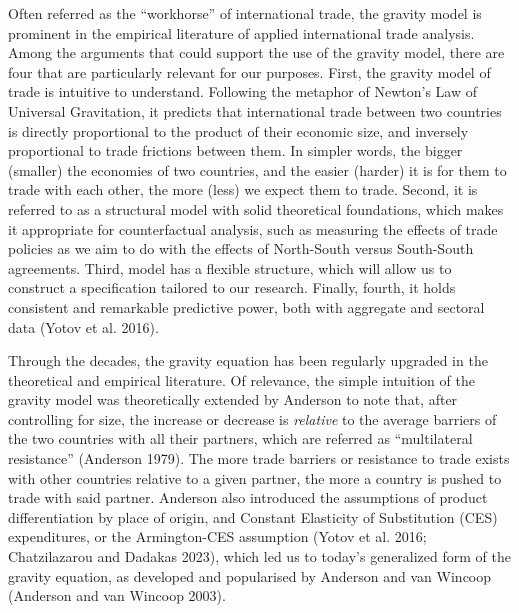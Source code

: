 \documentclass[12pt]{article}%
\begin{document}
%
Often referred as the ``workhorse'' of international trade, the gravity
model is prominent in the empirical literature of applied international
trade analysis. Among the arguments that could support the use of the
gravity model, there are four that are particularly relevant for our
purposes. First, the gravity model of trade is intuitive to understand.
Following the metaphor of Newton's Law of Universal Gravitation, it
predicts that international trade between two countries is directly
proportional to the product of their economic size, and inversely
proportional to trade frictions between them. In simpler words, the
bigger (smaller) the economies of two countries, and the easier (harder)
it is for them to trade with each other, the more (less) we expect them
to trade. Second, it is referred to as a structural model with solid
theoretical foundations, which makes it appropriate for counterfactual
analysis, such as measuring the effects of trade policies as we aim to
do with the effects of North-South versus South-South agreements. Third,
model has a flexible structure, which will allow us to construct a
specification tailored to our research. Finally, fourth, it holds
consistent and remarkable predictive power, both with aggregate and
sectoral data (Yotov et al. 2016).

Through the decades, the gravity equation has been regularly upgraded in
the theoretical and empirical literature. Of relevance, the simple
intuition of the gravity model was theoretically extended by Anderson to
note that, after controlling for size, the increase or decrease is
\emph{relative} to the average barriers of the two countries with all
their partners, which are referred as ``multilateral resistance''
(Anderson 1979). The more trade barriers or resistance to trade exists
with other countries relative to a given partner, the more a country is
pushed to trade with said partner. Anderson also introduced the
assumptions of product differentiation by place of origin, and Constant
Elasticity of Substitution (CES) expenditures, or the Armington-CES
assumption (Yotov et al. 2016; Chatzilazarou and Dadakas 2023), which
led us to today's generalized form of the gravity equation, as developed
and popularised by Anderson and van Wincoop (Anderson and van Wincoop
2003).
\end{document}
